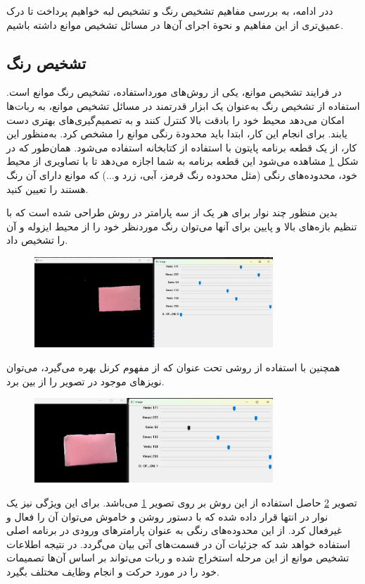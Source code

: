 ددر ادامه، به بررسی مفاهیم تشخیص رنگ و تشخیص لبه خواهیم پرداخت تا درک عمیق‌تری از این مفاهیم و نحوة اجرای آن‌ها در مسائل تشخیص موانع داشته باشیم.
\subsection{تشخیص رنگ}
\label{تشخیص رنگ}
در فرایند تشخیص موانع، یکی از روش‌های مورداستفاده، تشخیص رنگ موانع است. استفاده از تشخیص رنگ به‌عنوان یک ابزار قدرتمند در مسائل تشخیص موانع، به ربات‌ها امکان می‌دهد محیط خود را بادقت بالا کنترل کنند و به تصمیم‌گیری‌های بهتری دست یابند. برای انجام این کار، ابتدا باید محدودة رنگی موانع را مشخص کرد. به‌منظور این کار، از یک قطعه برنامه پایتون با استفاده از کتابخانه
استفاده می‌شود. همان‌طور که در شکل
\ref{ColorCalibration}
مشاهده می‌شود این قطعه برنامه به شما اجازه می‌دهد تا با تصاویری از محیط خود، محدوده‌های رنگی (مثل محدوده رنگ قرمز، آبی، زرد و...) که موانع دارای آن رنگ هستند را تعیین کنید.

بدین منظور چند نوار برای هر یک از سه پارامتر در روش
طراحی شده است که با تنظیم بازه‌های بالا و پایین برای آنها می‌توان رنگ موردنظر خود را از محیط ایزوله و آن را تشخیص داد.

\begin{figure}[h]
	\centering
	\includegraphics[width=0.8\textwidth]{./images/Chapter2/FindColorBoundry}	
	\caption[]{}
	\label{ColorCalibration}
\end{figure}
\noindent
\unskip

همچنین با استفاده از روشی تحت عنوان
که از مفهوم کرنل بهره می‌گیرد، می‌توان نویز‌های موجود در تصویر را از بین برد.

\begin{figure}[h]
	\centering
	\includegraphics[width=0.8\textwidth]{./images/Chapter2/FindColorBoundryMorphologyOn}	
	\caption[]{}
	\label{ColorCalibrationMorph}
\end{figure}
\noindent
\unskip
تصویر
\ref{ColorCalibrationMorph}
حاصل استفاده از این روش بر روی تصویر
\ref{ColorCalibration}
می‌باشد.
برای این ویژگی نیز یک نوار در انتها قرار داده شده که با دستور روشن و خاموش می‌توان آن را فعال و غیرفعال کرد.
از این محدوده‌های رنگی به عنوان پارامترهای ورودی در برنامه اصلی استفاده خواهد شد که جزئیات آن در قسمت‌های آتی بیان می‌گردد.
در نتیجه اطلاعات تشخیص موانع از این مرحله استخراج شده و ربات می‌تواند بر اساس آن‌ها تصمیمات خود را در مورد حرکت و انجام وظایف مختلف بگیرد.


